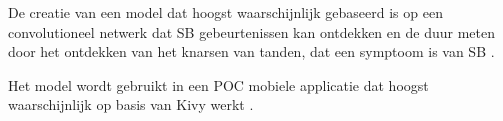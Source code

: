 \documentclass{hogent-article}
\begin{document}
De creatie van een model dat hoogst waarschijnlijk gebaseerd is op een convolutioneel netwerk dat SB gebeurtenissen kan ontdekken en de duur meten door het ontdekken van het knarsen van tanden, dat een symptoom is van SB .

Het model wordt gebruikt in een POC mobiele applicatie dat hoogst waarschijnlijk op basis van Kivy werkt .










\printbibliography
\end{document}
